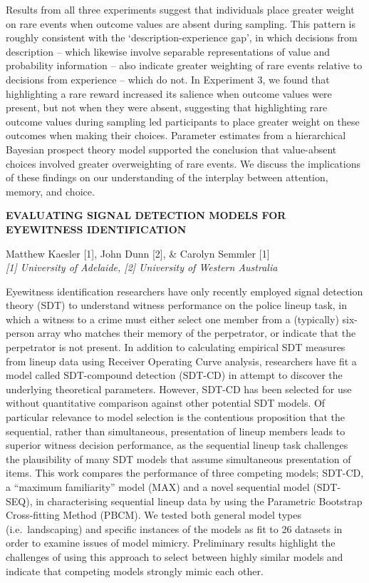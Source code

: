 \documentclass[]{article}
\begin{document}
Results from all three experiments suggest that individuals place
greater weight on rare events when outcome values are absent during
sampling. This pattern is roughly consistent with the
`description-experience gap', in which decisions from description --
which likewise involve separable representations of value and
probability information -- also indicate greater weighting of rare
events relative to decisions from experience -- which do not. In
Experiment 3, we found that highlighting a rare reward increased its
salience when outcome values were present, but not when they were
absent, suggesting that highlighting rare outcome values during sampling
led participants to place greater weight on these outcomes when making
their choices. Parameter estimates from a hierarchical Bayesian prospect
theory model supported the conclusion that value-absent choices involved
greater overweighting of rare events. We discuss the implications of
these findings on our understanding of the interplay between attention,
memory, and choice.\\
\pagebreak  

\textbf{EVALUATING SIGNAL DETECTION MODELS FOR EYEWITNESS
IDENTIFICATION}

Matthew Kaesler {[}1{]}, John Dunn {[}2{]}, \& Carolyn Semmler {[}1{]}\\
\emph{{[}1{]} University of Adelaide, {[}2{]} University of Western
Australia}

Eyewitness identification researchers have only recently employed signal
detection theory (SDT) to understand witness performance on the police
lineup task, in which a witness to a crime must either select one member
from a (typically) six-person array who matches their memory of the
perpetrator, or indicate that the perpetrator is not present. In
addition to calculating empirical SDT measures from lineup data using
Receiver Operating Curve analysis, researchers have fit a model called
SDT-compound detection (SDT-CD) in attempt to discover the underlying
theoretical parameters. However, SDT-CD has been selected for use
without quantitative comparison against other potential SDT models. Of
particular relevance to model selection is the contentious proposition
that the sequential, rather than simultaneous, presentation of lineup
members leads to superior witness decision performance, as the
sequential lineup task challenges the plausibility of many SDT models
that assume simultaneous presentation of items. This work compares the
performance of three competing models; SDT-CD, a ``maximum familiarity''
model (MAX) and a novel sequential model (SDT-SEQ), in characterising
sequential lineup data by using the Parametric Bootstrap Cross-fitting
Method (PBCM). We tested both general model types (i.e.~landscaping) and
specific instances of the models as fit to 26 datasets in order to
examine issues of model mimicry. Preliminary results highlight the
challenges of using this approach to select between highly similar
models and indicate that competing models strongly mimic each other.\\
\pagebreak  
\end{document}
